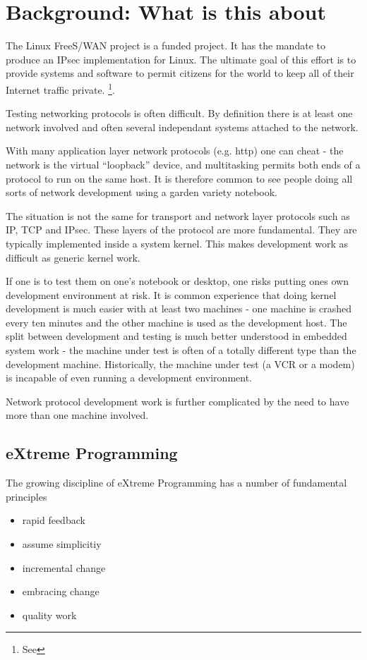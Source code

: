 \section{Background: What is this about}

The Linux FreeS/WAN project is a funded project. It has the mandate to
produce an IPsec implementation for Linux. The ultimate goal of this effort
is to provide systems and software to permit citizens for the world to keep
all of their Internet traffic private.
\footnote{See }.

Testing networking protocols is often difficult. By definition there is at
least one network involved and often several independant systems attached to
the network. 

With many application layer network protocols (e.g. http) one can cheat - the 
network is the virtual ``loopback'' device, and multitasking permits both
ends of a protocol to run on the same host. It is therefore common to see
people doing all sorts of network development using a garden variety notebook.

The situation is not the same for transport and network layer protocols such
as IP, TCP and IPsec. These layers of the protocol are more fundamental. They 
are typically implemented inside a system kernel. This makes development work
as difficult as generic kernel work.

If one is to test them on one's notebook or desktop, one risks putting ones
own development environment at risk. It is common experience that doing
kernel development is much easier with at least two machines - one machine is 
crashed every ten minutes and the other machine is used as the development
host. The split between development and testing is much better understood in
embedded system work - the machine under test is often of a totally different 
type than the development machine. Historically, the machine under test (a
VCR or a modem) is incapable of even running a development environment. 

Network protocol development work is further complicated by the need to have
more than one machine involved. 

\subsection{eXtreme Programming}

The growing discipline of eXtreme Programming\cite{XP}
has a number of fundamental principles
\begin{itemize}
\item rapid feedback
\item assume simplicitiy
\item incremental change
\item embracing change
\item quality work
\end{itemize}

